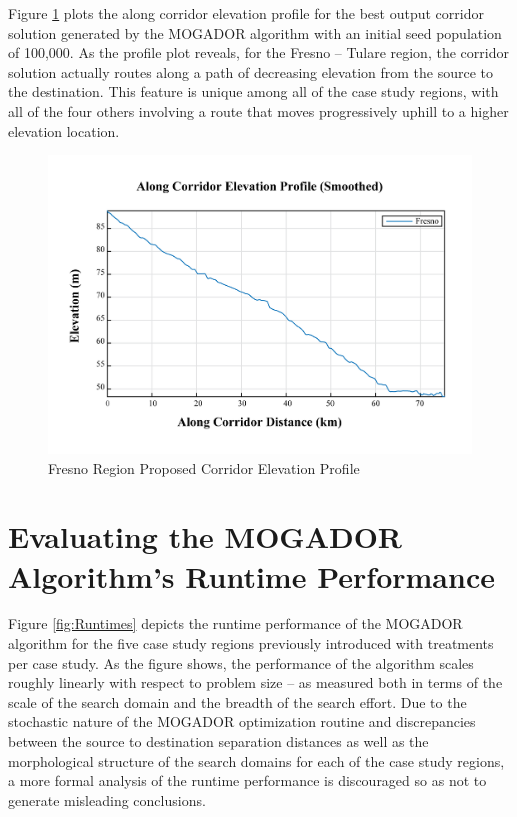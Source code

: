 Figure \ref{fig:FelevationProfile} plots the along corridor elevation profile for the best output corridor solution generated by the MOGADOR algorithm with an initial seed population of 100,000. As the profile plot reveals, for the Fresno -- Tulare region, the corridor solution actually routes along a path of decreasing elevation from the source to the destination. This feature is unique among all of the case study regions, with all of the four others involving a route that moves progressively uphill to a higher elevation location. 
        
        \begin{figure}[!h]
            \begin{center}
            \includegraphics[width=5.5in]{figures/Fresno_Elevation_Profile.png}   
            \caption{Fresno Region Proposed Corridor Elevation Profile}
            \label{fig:FelevationProfile}
            \end{center}
        \end{figure}

\clearpage
    
\section{Evaluating the MOGADOR Algorithm's Runtime Performance}

Figure \ref{fig:Runtimes} depicts the runtime performance of the MOGADOR algorithm for the five case study regions previously introduced with treatments per case study. As the figure shows, the performance of the algorithm scales roughly linearly with respect to problem size -- as measured both in terms of the scale of the search domain and the breadth of the search effort. Due to the stochastic nature of the MOGADOR optimization routine and discrepancies between the source to destination separation distances as well as the morphological structure of the search domains for each of the case study regions, a more formal analysis of the runtime performance is discouraged so as not to generate misleading conclusions. 

